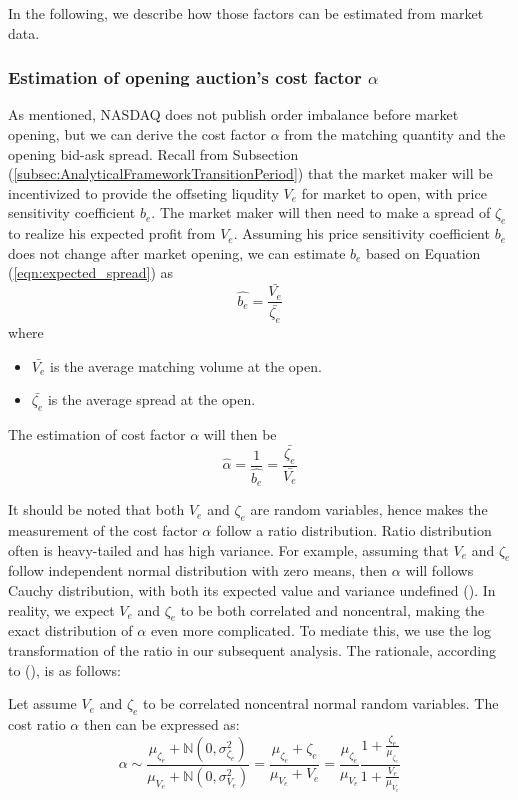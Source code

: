 \documentclass{article}
\begin{document}
In the following, we describe how those factors can be estimated from market data.

\subsubsection{Estimation of opening auction's cost factor $\alpha$}

As mentioned, NASDAQ does not publish order imbalance before market opening, but we can derive the cost factor $\alpha$ from the matching quantity and the opening bid-ask spread. Recall from Subsection (\ref{subsec:AnalyticalFrameworkTransitionPeriod}) that the market maker will be incentivized to provide the offseting liqudity $V_e$ for market to open, with price sensitivity coefficient $b_e$. The market maker will then need to make a spread of $\zeta_e$ to realize his expected profit from $V_e$. Assuming his price sensitivity coefficient $b_e$ does not change after market opening, we can estimate $b_e$ based on Equation (\ref{eqn:expected_spread}) as
\[
  \hat{b_e} = \frac{\bar{V_e}}{\bar{\zeta_e}}
\]
where
\begin{itemize}
  \item $\bar{V_e}$ is the average matching volume at the open.
  \item $\bar{\zeta_e}$ is the average spread at the open.
\end{itemize}

The estimation of cost factor $\alpha$ will then be
\[
  \hat{\alpha} = \frac{1}{\hat{b_e}}  = \frac{\bar{\zeta_e}}{\bar{V_e}}
\]

It should be noted that both $V_e$ and $\zeta_e$ are random variables, hence makes the measurement of the cost factor $\alpha$ follow a ratio distribution. Ratio distribution often is heavy-tailed and has high variance. For example, assuming that $V_e$ and $\zeta_e$ follow independent normal distribution with zero means, then $\alpha$ will follows Cauchy distribution, with both its expected value and variance undefined (\cite{Geary1930}). In reality, we expect $V_e$ and $\zeta_e$ to be both correlated and noncentral, making the exact distribution of $\alpha$ even more complicated. To mediate this, we use the log transformation of the ratio in our subsequent analysis. The rationale, according to (\cite{Katz1978}), is as follows:

Let assume $V_e$ and $\zeta_e$ to be correlated noncentral normal random variables. The cost ratio $\alpha$ then can be expressed as:
\[ \alpha \sim \frac{\mu_{\zeta_e} + \mathbb{N}(0, \sigma_{\zeta_e}^2 )}{\mu_{V_e} + \mathbb{N}(0, \sigma_{V_e}^2 )}
  = \frac{\mu_{\zeta_e} + \zeta_e}{\mu_{V_e} + V_e}
  = \frac{\mu_{\zeta_e}}{\mu_{V_e}}\frac{1+ \frac{\zeta_e}{\mu_{\zeta_e}}}{1+ \frac{V_e}{\mu_{V_e}}}
\]
\end{document}
